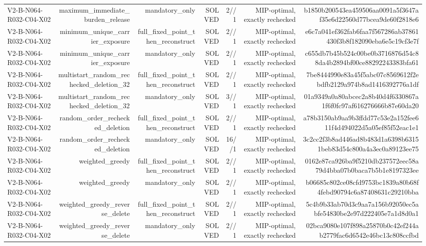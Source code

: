 {\begin{longtable}{lrrrrrr}
V2-B-N064-R032-C04-X02 & maximum\_immediate\_burden\_release & mandatory\_only & SOLVED & 2//1 & MIP-optimal, exactly rechecked & b1850b200543ea459506aa0091a5f3647af35e6d22560d77bcea9de60f2818e6 \\
V2-B-N064-R032-C04-X02 & minimum\_unique\_carrier\_exposure & full\_fixed\_point\_then\_reconstruct & SOLVED & 2//1 & MIP-optimal, exactly rechecked & e6c7a041ef362fab6faa7f567286ab37861430f3b8f182090eba6e5c19cf3e7f \\
V2-B-N064-R032-C04-X02 & minimum\_unique\_carrier\_exposure & mandatory\_only & SOLVED & 2//1 & MIP-optimal, exactly rechecked & c655db7b45b524c00be0b3716876d54c88da4b2894bf00ce88292243383bfa61 \\
V2-B-N064-R032-C04-X02 & multistart\_random\_rechecked\_deletion\_32 & full\_fixed\_point\_then\_reconstruct & SOLVED & 2//1 & MIP-optimal, exactly rechecked & 7be8444990e83a45f5abc07c8569612f2ebdfb2129a974b8ad1416392776a1df \\
V2-B-N064-R032-C04-X02 & multistart\_random\_rechecked\_deletion\_32 & mandatory\_only & SOLVED & 3//1 & MIP-optimal, exactly rechecked & 01a9349a0a80abcec2a8b40d4f6330867a1f6f0fc97af616276666b87e60da20 \\
V2-B-N064-R032-C04-X02 & random\_order\_rechecked\_deletion & full\_fixed\_point\_then\_reconstruct & SOLVED & 2//1 & MIP-optimal, exactly rechecked & a78b3150ab9aa9b3ffdd77c53e2a152fee611f4d494022d5a05ef85f52eac1e1 \\
V2-B-N064-R032-C04-X02 & random\_order\_rechecked\_deletion & mandatory\_only & SOLVED & 16//1 & MIP-optimal, exactly rechecked & 3c2cc2f3b8ad446ad8b483d1a6398b63151beb83d54c800a4a3ec0a89123ee75 \\
V2-B-N064-R032-C04-X02 & weighted\_greedy & full\_fixed\_point\_then\_reconstruct & SOLVED & 2//1 & MIP-optimal, exactly rechecked & 0162e87ca926ba9f5210db237572eec58a79d4bba07b0baca7b5b1e8197323ee \\
V2-B-N064-R032-C04-X02 & weighted\_greedy & mandatory\_only & SOLVED & 2//1 & MIP-optimal, exactly rechecked & b06685c802ce08cfd9753bc1839a80b68f4febd90794c6a87408631c29210bba \\
V2-B-N064-R032-C04-X02 & weighted\_greedy\_reverse\_delete & full\_fixed\_point\_then\_reconstruct & SOLVED & 2//1 & MIP-optimal, exactly rechecked & 5c4b9b33ab70d3c9aa7a156b92050ec5abfe54830be2e97d222405e7a1d8d0a1 \\
V2-B-N064-R032-C04-X02 & weighted\_greedy\_reverse\_delete & mandatory\_only & SOLVED & 2//1 & MIP-optimal, exactly rechecked & 02bca9080e107f898a25870b0c42ef244ab2779fac6d6542e46bc13c808ccfbd \\

\end{longtable}}
